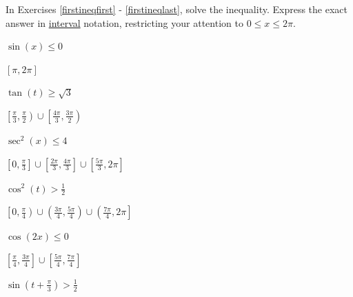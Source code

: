 \documentclass{ximera}
\begin{document}
\begin{question}
In Exercises \ref{firstineqfirst} - \ref{firstineqlast}, solve the inequality.  Express the exact answer in \underline{interval} notation, restricting your attention to $0 \leq x \leq 2\pi$.

\begin{problem} \label{firstineqfirst}
$\sin \left( x \right) \leq 0$ 

\begin{solution}
$\left[ \pi, 2\pi \right]$
\end{solution}
\end{problem}

\begin{problem}
$\tan \left( t \right) \geq \sqrt{3}$

\begin{solution}
$\left[ \frac{\pi}{3}, \frac{\pi}{2} \right) \cup \left[ \frac{4\pi}{3}, \frac{3\pi}{2} \right)$
\end{solution}
\end{problem}

\begin{problem}
$\sec^{2} \left( x \right) \leq 4$

\begin{solution}
$\left[ 0, \frac{\pi}{3} \right] \cup \left[ \frac{2\pi}{3}, \frac{4\pi}{3} \right] \cup \left[ \frac{5\pi}{3}, 2\pi \right]$
\end{solution}
\end{problem}

\begin{problem}
 $\cos^{2} \left( t \right) > \frac{1}{2}$

\begin{solution}
$\left[ 0, \frac{\pi}{4} \right) \cup \left( \frac{3\pi}{4}, \frac{5\pi}{4} \right) \cup \left( \frac{7\pi}{4}, 2\pi \right]$
\end{solution}
\end{problem}
 
\begin{problem}
$\cos \left( 2x \right) \leq 0$

\begin{solution}
$\left[ \frac{\pi}{4}, \frac{3\pi}{4} \right] \cup \left[ \frac{5\pi}{4}, \frac{7\pi}{4} \right]$
\end{solution}
\end{problem}

\begin{problem}
$\sin \left( t + \frac{\pi}{3} \right) > \frac{1}{2}$


\end{problem}
\end{question}
\end{document}
